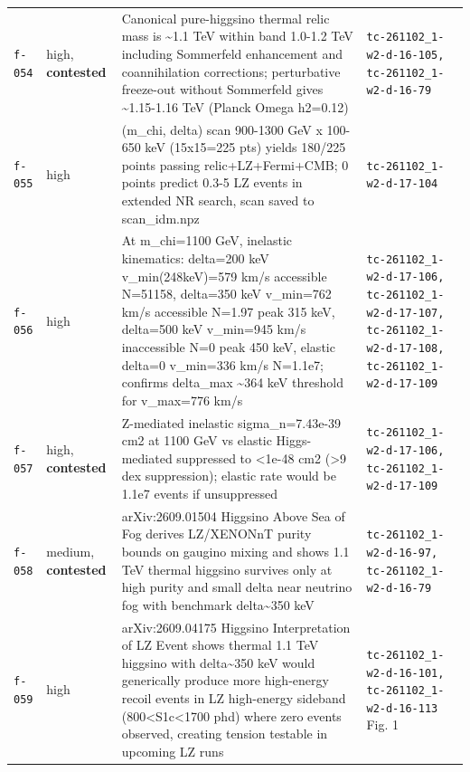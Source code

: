 \documentclass[11pt,a4paper]{article}
\begin{document}
\begin{longtable}{@{}p{}p{}p{}p{}@{}}
\texttt{f-054} & high, \textbf{contested} & Canonical pure-higgsino thermal relic mass is \textasciitilde{}1.1 TeV within band 1.0-1.2 TeV including Sommerfeld enhancement and coannihilation corrections; perturbative freeze-out without Sommerfeld gives \textasciitilde{}1.15-1.16 TeV (Planck Omega h2=0.12) & \texttt{tc-261102\_\allowbreak{}1-w2-d-16-105,\allowbreak{} tc-261102\_\allowbreak{}1-w2-d-16-79} \\
\texttt{f-055} & high & (m\_chi, delta) scan 900-1300 GeV x 100-650 keV (15x15=225 pts) yields 180/225 points passing relic+LZ+Fermi+CMB; 0 points predict 0.3-5 LZ events in extended NR search, scan saved to scan\_idm.npz & \texttt{tc-261102\_\allowbreak{}1-w2-d-17-104} \\
\texttt{f-056} & high & At m\_chi=1100 GeV, inelastic kinematics: delta=200 keV v\_min(248keV)=579 km/s accessible N=51158, delta=350 keV v\_min=762 km/s accessible N=1.97 peak 315 keV, delta=500 keV v\_min=945 km/s inaccessible N=0 peak 450 keV, elastic delta=0 v\_min=336 km/s N=1.1e7; confirms delta\_max \textasciitilde{}364 keV threshold for v\_max=776 km/s & \texttt{tc-261102\_\allowbreak{}1-w2-d-17-106,\allowbreak{} tc-261102\_\allowbreak{}1-w2-d-17-107,\allowbreak{} tc-261102\_\allowbreak{}1-w2-d-17-108,\allowbreak{} tc-261102\_\allowbreak{}1-w2-d-17-109} \\
\texttt{f-057} & high, \textbf{contested} & Z-mediated inelastic sigma\_n=7.43e-39 cm2 at 1100 GeV vs elastic Higgs-mediated suppressed to \textless{}1e-48 cm2 (\textgreater{}9 dex suppression); elastic rate would be 1.1e7 events if unsuppressed & \texttt{tc-261102\_\allowbreak{}1-w2-d-17-106,\allowbreak{} tc-261102\_\allowbreak{}1-w2-d-17-109} \\
\texttt{f-058} & medium, \textbf{contested} & arXiv:2609.01504 Higgsino Above Sea of Fog derives LZ/XENONnT purity bounds on gaugino mixing and shows 1.1 TeV thermal higgsino survives only at high purity and small delta near neutrino fog with benchmark delta\textasciitilde{}350 keV & \texttt{tc-261102\_\allowbreak{}1-w2-d-16-97,\allowbreak{} tc-261102\_\allowbreak{}1-w2-d-16-79} \\
\texttt{f-059} & high & arXiv:2609.04175 Higgsino Interpretation of LZ Event shows thermal 1.1 TeV higgsino with delta\textasciitilde{}350 keV would generically produce more high-energy recoil events in LZ high-energy sideband (800\textless{}S1c\textless{}1700 phd) where zero events observed, creating tension testable in upcoming LZ runs & \texttt{tc-261102\_\allowbreak{}1-w2-d-16-101,\allowbreak{} tc-261102\_\allowbreak{}1-w2-d-16-113} Fig. 1 \\

\end{longtable}
\end{document}
